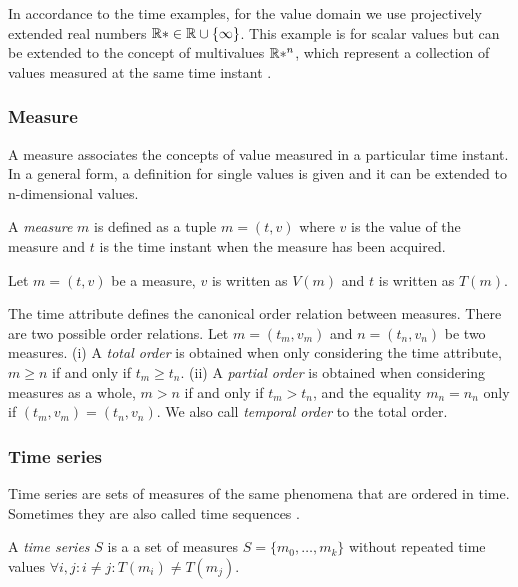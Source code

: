 In accordance to the time examples, for the value domain we use
projectively extended real numbers $\mathbb{R}* \in \mathbb{R} \cup \{\infty\}$.  This
example is for scalar values but can be extended to the concept of
multivalues $\mathbb{R}*^n$, which represent a collection of values measured
at the same time instant \cite{assfalg08:thesis}.




\subsubsection{Measure}

A measure associates the concepts of value measured in a particular
time instant.  In a general form, a definition for single values is
given and it can be extended to n-dimensional values.

\begin{definition}
  A \emph{measure} $m$ is defined as a tuple $m=(t,v)$ where $v$ is the
  value of the measure and $t$ is the time instant when the measure
  has been acquired.
\end{definition}

Let $m = (t,v)$ be a measure, $v$ is written as $V(m)$ and $t$ is
written as $T(m)$.

The time attribute defines the canonical order relation between
measures. There are two possible order relations. Let $m = (t_m, v_m)$
and $n = (t_n, v_n)$ be two measures.  (i) A \emph{total order} is
obtained when only considering the time attribute, $m\geq n$ if and
only if $t_m\geq t_n$.  (ii) A \emph{partial order} is obtained when
considering measures as a whole, $m > n$ if and only if $t_m > t_n$,
and the equality $m_n = n_n$ only if $(t_m, v_m) = (t_n, v_n)$.  We
also call \emph{temporal order} to the total order.



\subsubsection{Time series}

Time series are sets of measures of the same phenomena that are
ordered in time.  Sometimes they are also called time sequences
\cite{last:hetland}.


\begin{definition}
  A \emph{time series} $S$ is a a set of measures $S = \{m_0, \ldots,
  m_k\}$ without repeated time values $\forall i,j:i\neq j: T(m_i)\neq
  T(m_j)$.
\end{definition}

